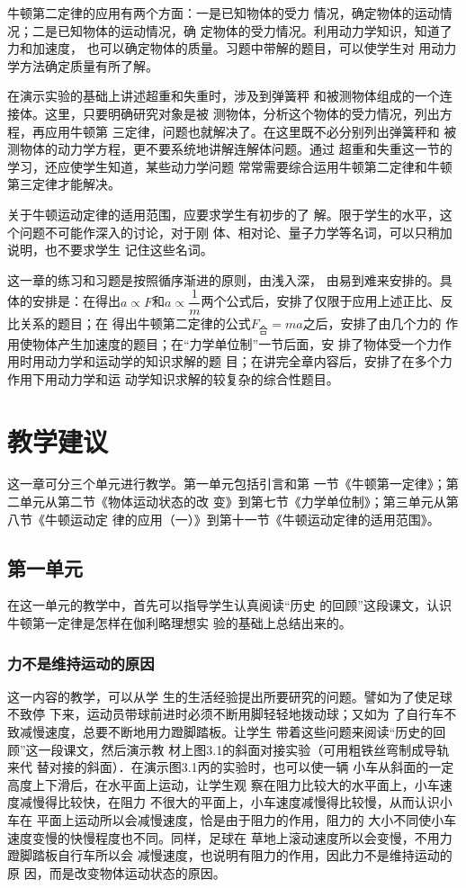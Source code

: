 牛顿第二定律的应用有两个方面：一是已知物体的受力
情况，确定物体的运动情况；二是已知物体的运动情况，确
定物体的受力情况。利用动力学知识，知道了力和加速度，
也可以确定物体的质量。习题中带解的题目，可以使学生对
用动力学方法确定质量有所了解。

在演示实验的基础上讲述超重和失重时，涉及到弹簧秤
和被测物体组成的一个连接体。这里，只要明确研究对象是被
测物体，分析这个物体的受力情况，列出方程，再应用牛顿第
三定律，问题也就解决了。在这里既不必分别列出弹簧秤和
被测物体的动力学方程，更不要系统地讲解连解体问题。通过
超重和失重这一节的学习，还应使学生知道，某些动力学问题
常常需要综合运用牛顿第二定律和牛顿第三定律才能解决。

关于牛顿运动定律的适用范围，应要求学生有初步的了
解。限于学生的水平，这个问题不可能作深入的讨论，对于刚
体、相对论、量子力学等名词，可以只稍加说明，也不要求学生
记住这些名词。

这一章的练习和习题是按照循序渐进的原则，由浅入深，
由易到难来安排的。具体的安排是：在得出$a\propto F$和$a\propto \dfrac{1}{m}$两个公式后，安排了仅限于应用上述正比、反比关系的题目；在
得出牛顿第二定律的公式$F_{\text{合}}=ma$之后，安排了由几个力的
作用使物体产生加速度的题目；在“力学单位制”一节后面，安
排了物体受一个力作用时用动力学和运动学的知识求解的题
目；在讲完全章内容后，安排了在多个力作用下用动力学和运
动学知识求解的较复杂的综合性题目。

\section{教学建议}
这一章可分三个单元进行教学。第一单元包括引言和第
一节《牛顿第一定律》；第二单元从第二节《物体运动状态的改
变》到第七节《力学单位制》；第三单元从第八节《牛顿运动定
律的应用（一）》到第十一节《牛顿运动定律的适用范围》。

\subsection{第一单元}
在这一单元的教学中，首先可以指导学生认真阅读“历史
的回顾”这段课文，认识牛顿第一定律是怎样在伽利略理想实
验的基础上总结出来的。

\subsubsection{力不是维持运动的原因}

这一内容的教学，可以从学
生的生活经验提出所要研究的问题。譬如为了使足球不致停
下来，运动员带球前进时必须不断用脚轻轻地拨动球；又如为
了自行车不致减慢速度，总要不断地用力蹬脚踏板。让学生
带着这些问题来阅读“历史的回顾”这一段课文，然后演示教
材上图3.1的斜面对接实验（可用粗铁丝弯制成导轨来代
替对接的斜面）．在演示图3.1丙的实验时，也可以使一辆
小车从斜面的一定高度上下滑后，在水平面上运动，让学生观
察在阻力比较大的水平面上，小车速度减慢得比较快，在阻力
不很大的平面上，小车速度减慢得比较慢，从而认识小车在
平面上运动所以会减慢速度，恰是由于阻力的作用，阻力的
大小不同使小车速度变慢的快慢程度也不同。同样，足球在
草地上滚动速度所以会变慢，不用力蹬脚踏板自行车所以会
减慢速度，也说明有阻力的作用，因此力不是维持运动的原
因，而是改变物体运动状态的原因。

